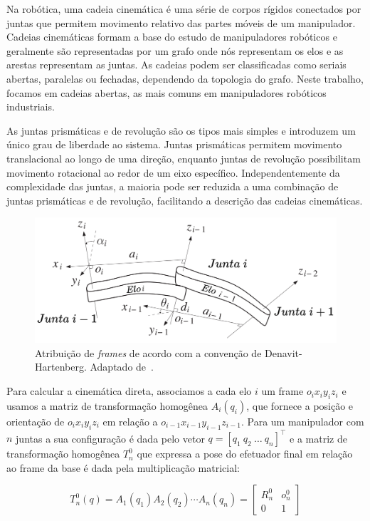 Na robótica, uma cadeia cinemática é uma série de corpos rígidos conectados por 
juntas que permitem movimento relativo das partes móveis de um manipulador. 
Cadeias cinemáticas formam a base do estudo de manipuladores robóticos e geralmente 
são representadas por um grafo onde nós representam os elos e as arestas 
representam as juntas. As cadeias podem ser classificadas como seriais abertas, 
paralelas ou fechadas, dependendo da topologia do grafo. Neste trabalho, 
focamos em cadeias abertas, as mais comuns em manipuladores robóticos industriais.

As juntas prismáticas e de revolução são os tipos mais simples e introduzem um 
único grau de liberdade ao sistema. Juntas prismáticas permitem movimento 
translacional ao longo de uma direção, enquanto juntas de revolução possibilitam 
movimento rotacional ao redor de um eixo específico. Independentemente da 
complexidade das juntas, a maioria pode ser reduzida a uma combinação de juntas 
prismáticas e de revolução, facilitando a descrição das cadeias cinemáticas.

\begin{figure}
    \centering
    \includegraphics[width=0.8\linewidth]{Images/dh-assignment.png}
    \caption{Atribuição de \emph{frames} de acordo com a convenção de Denavit-Hartenberg. Adaptado de~\cite{spong_robot_2020}.}\label{fig:dh-assignment}
\end{figure}

Para calcular a cinemática direta, associamos a cada elo \(i\) um frame 
\(o_i x_i y_i z_i\) e usamos a matriz de transformação homogênea \(A_i(q_i)\), que 
fornece a posição e orientação de \(o_i x_i y_i z_i\) em relação a 
\(o_{i-1} x_{i-1} y_{i-1} z_{i-1}\). Para um manipulador com \(n\) juntas a sua configuração é dada pelo vetor \(q = [q_1 \ q_2 \ \ldots \ q_n]^\top\)
e a matriz de transformação homogênea \(T^0_n\) que expressa a pose
do efetuador final em relação ao frame da base é dada pela multiplicação matricial:

\begin{equation}\label{eq:fkine}
    T^0_n(q) = A_1(q_1) A_2(q_2) \cdots A_n(q_n) = \begin{bmatrix}
        R^0_n & o^0_n \\
        0     & 1
    \end{bmatrix}
\end{equation}

